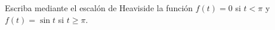 Escriba mediante el escalón de Heaviside la función $f(t)=0$ si $t<\pi$ y $f(t)=\sin t$ si $t\ge\pi$.
